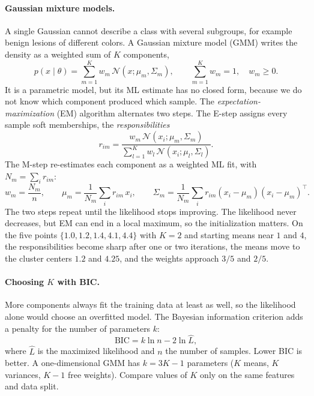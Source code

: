 \paragraph{Gaussian mixture models.}
A single Gaussian cannot describe a class with several subgroups, for example
benign lesions of different colors. A Gaussian mixture model (GMM) writes the
density as a weighted sum of $K$ components,
\begin{equation}
  p(x\mid\theta) = \sum_{m=1}^{K} w_m\,\mathcal N(x;\mu_m,\Sigma_m),
  \qquad \sum_{m=1}^K w_m = 1,\quad w_m\ge 0 .
\end{equation}
\noindent
It is a parametric model, but its ML estimate has no closed form, because we do
not know which component produced which sample. The
\emph{expectation-maximization} (EM) algorithm alternates two steps. The E-step
assigns every sample soft memberships, the \emph{responsibilities}
\begin{equation}
  r_{im} = \frac{w_m\,\mathcal N(x_i;\mu_m,\Sigma_m)}
                {\sum_{l=1}^{K} w_l\,\mathcal N(x_i;\mu_l,\Sigma_l)} .
\end{equation}
\noindent
The M-step re-estimates each component as a weighted ML fit, with
$N_m = \sum_i r_{im}$:
\begin{equation}
  w_m = \frac{N_m}{n},
  \qquad
  \mu_m = \frac{1}{N_m}\sum_i r_{im}\,x_i,
  \qquad
  \Sigma_m = \frac{1}{N_m}\sum_i r_{im}(x_i-\mu_m)(x_i-\mu_m)^\top .
\end{equation}
\noindent
The two steps repeat until the likelihood stops improving. The likelihood never
decreases, but EM can end in a local maximum, so the initialization matters. On
the five points $\{1.0,1.2,1.4,4.1,4.4\}$ with $K=2$ and starting means near $1$
and $4$, the responsibilities become sharp after one or two iterations, the
means move to the cluster centers $1.2$ and $4.25$, and the weights approach
$3/5$ and $2/5$.

\paragraph{Choosing $K$ with BIC.}
More components always fit the training data at least as well, so the
likelihood alone would choose an overfitted model. The Bayesian information
criterion adds a penalty for the number of parameters $k$:
\begin{equation}
  \mathrm{BIC} = k\ln n - 2\ln\hat L ,
\end{equation}
\noindent
where $\hat L$ is the maximized likelihood and $n$ the number of samples. Lower
BIC is better. A one-dimensional GMM has $k = 3K-1$ parameters ($K$ means, $K$
variances, $K-1$ free weights). Compare values of $K$ only on the same features
and data split.

